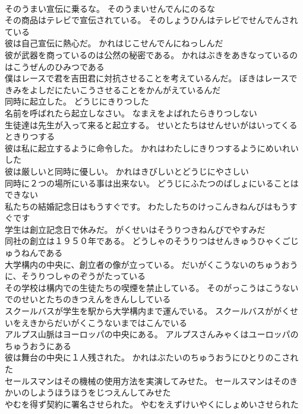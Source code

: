 \documentclass[8pt]{extreport}
\begin{document}
\begin{CJK}{UTF8}{min}
\\	そのうまい宣伝に乗るな。	そのうまいせんでんにのるな 
\\	その商品はテレビで宣伝されている。	そのしょうひんはテレビでせんでんされている 
\\	彼は自己宣伝に熱心だ。	かれはじこせんでんにねっしんだ 
\\	彼が武器を商っているのは公然の秘密である。	かれはぶきをあきなっているのはこうぜんのひみつである 
\\	僕はレースで君を吉田君に対抗させることを考えているんだ。	ぼきはレースできみをよしだにたいこうさせることをかんがえているんだ 
\\	同時に起立した。	どうじにきりつした 
\\	名前を呼ばれたら起立しなさい。	なまえをよばれたらきりつしない 
\\	生徒達は先生が入って来ると起立する。	せいとたちはせんせいがはいってくるときりつする 
\\	彼は私に起立するように命令した。	かれはわたしにきりつするようにめいれいした 
\\	彼は厳しいと同時に優しい。	かれはきびしいとどうじにやさしい 
\\	同時に２つの場所にいる事は出来ない。	どうじにふたつのばしょにいることはできない 
\\	私たちの結婚記念日はもうすぐです。	わたしたちのけっこんきねんびはもうすぐです 
\\	学生は創立記念日で休みだ。	がくせいはそうりつきねんびでやすみだ 
\\	同社の創立は１９５０年である。	どうしゃのそうりつはせんきゅうひゃくごじゅうねんである 
\\	大学構内の中央に、創立者の像が立っている。	だいがくこうないのちゅうおうに、そうりつしゃのぞうがたっている 
\\	その学校は構内での生徒たちの喫煙を禁止している。	そのがっこうはこうないでのせいとたちのきつえんをきんししている 
\\	スクールバスが学生を駅から大学構内まで運んでいる。	スクールバスががくせいをえきからだいがくこうないまではこんでいる 
\\	アルプス山脈はヨーロッパの中央にある。	アルプスさんみゃくはユーロッパのちゅうおうにある 
\\	彼は舞台の中央に１人残された。	かれはぶたいのちゅうおうにひとりのこされた 
\\	セールスマンはその機械の使用方法を実演してみせた。	セールスマンはそのきかいのしようほうほうをじつえんしてみせた 
\\	やむを得ず契約に署名させられた。	やむをえずけいやくにしょめいさせられた 

\end{CJK}
\end{document}
